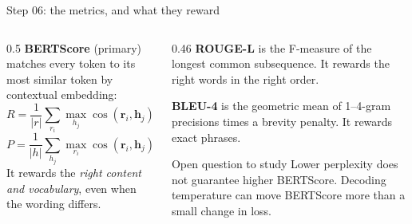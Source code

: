 \documentclass[aspectratio=169,11pt]{beamer}
\begin{document}
\begin{frame}{Step 06: the metrics, and what they reward}
  \begin{columns}[T]
    \begin{column}{0.5\textwidth}
      \small
      \textbf{BERTScore} (primary) matches every token to its most similar token by contextual embedding:
      \[ R=\frac1{|r|}\sum_{r_i}\max_{h_j}\cos(\mathbf r_i,\mathbf h_j) \]
      \[ P=\frac1{|h|}\sum_{h_j}\max_{r_i}\cos(\mathbf r_i,\mathbf h_j),\qquad F_1 = \frac{2PR}{P+R} \]
      It rewards the \emph{right content and vocabulary}, even when the wording differs.
    \end{column}
    \begin{column}{0.46\textwidth}
      \small
      \textbf{ROUGE-L} is the F-measure of the longest common subsequence. It rewards the right words in the right order.
      \vspace{1mm}

      \textbf{BLEU-4} is the geometric mean of 1--4-gram precisions times a brevity penalty. It rewards exact phrases.
      \vspace{2mm}
      \begin{alertblock}{Open question to study}
        \small
        Lower perplexity does not guarantee higher BERTScore.
        Decoding temperature can move BERTScore more than a small change in loss.
      \end{alertblock}
    \end{column}
  \end{columns}
\end{frame}
\end{document}
